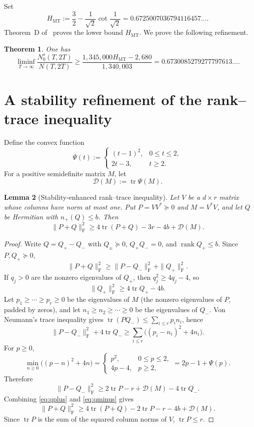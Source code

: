 \documentclass[11pt]{article}
\newtheorem{theorem}{Theorem}[section]
\newtheorem{lemma}[theorem]{Lemma}
\DeclareMathOperator{\tr}{tr}
\newcommand{\F}{\mathrm F}
\newcommand{\cD}{\mathcal D}
\begin{document}
Set
\[
 H_{\mathrm{MT}}
 :=\frac32-\frac1{\sqrt2}\cot\frac1{\sqrt2}
 =0.6725007036794116457\ldots .
\]
Theorem~D of~\cite{Claude26} proves the lower bound $H_{\mathrm{MT}}$.
We prove the following refinement.

\begin{theorem}\label{thm:main}
One has
\[
 \liminf_{T\to\infty}
 \frac{N_0^s(T,2T)}{N(T,2T)}
 \ge
 \frac{1{,}345{,}000H_{\mathrm{MT}}-2{,}680}{1{,}340{,}003}
 =0.6730085279277797613\ldots .
\]
\end{theorem}

\section{A stability refinement of the rank--trace inequality}

Define the convex function
\begin{equation}\label{eq:Psi}
 \Psi(t):=
 \begin{cases}
  (t-1)^2,&0\le t\le2,\\
  2t-3,&t\ge2.
 \end{cases}
\end{equation}
For a positive semidefinite matrix $M$, let
\[
 \cD(M):=\tr\Psi(M).
\]

\begin{lemma}[Stability-enhanced rank--trace inequality]\label{lem:stable-rank-trace}
Let $V$ be a $d\times r$ matrix whose columns have norm at most one.  Put
$P=VV^*\succeq0$ and $M=V^*V$, and let $Q$ be Hermitian with $n_+(Q)\le b$.
Then
\begin{equation}\label{eq:stable-rank-trace}
 \|P+Q\|_{\F}^2
 \ge 4\tr(P+Q)-3r-4b+\cD(M).
\end{equation}
\end{lemma}

\begin{proof}
Write $Q=Q_+-Q_-$ with $Q_\pm\succeq0$, $Q_+Q_-=0$, and
$\operatorname{rank}Q_+\le b$.  Since $P,Q_+\succeq0$,
\[
 \|P+Q\|_{\F}^2
 \ge \|P-Q_-\|_{\F}^2+\|Q_+\|_{\F}^2.
\]
If $q_j>0$ are the nonzero eigenvalues of $Q_+$, then
$q_j^2\ge4q_j-4$, so
\begin{equation}\label{eq:qplus}
 \|Q_+\|_{\F}^2\ge4\tr Q_+-4b.
\end{equation}
Let $p_1\ge\cdots\ge p_r\ge0$ be the eigenvalues of $M$ (the nonzero
eigenvalues of $P$, padded by zeros), and let $n_1\ge n_2\ge\cdots\ge0$
be the eigenvalues of $Q_-$.  Von Neumann's trace inequality gives
$\tr(PQ_-)\le\sum_{i\le r}p_in_i$, hence
\[
 \|P-Q_-\|_{\F}^2+4\tr Q_-
 \ge \sum_{i\le r}\bigl((p_i-n_i)^2+4n_i\bigr).
\]
For $p\ge0$,
\[
 \min_{n\ge0}\bigl((p-n)^2+4n\bigr)
 =\begin{cases}p^2,&0\le p\le2,\\4p-4,&p\ge2,\end{cases}
 =2p-1+\Psi(p).
\]
Therefore
\begin{equation}\label{eq:qminus}
 \|P-Q_-\|_{\F}^2
 \ge2\tr P-r+\cD(M)-4\tr Q_-.
\end{equation}
Combining \eqref{eq:qplus} and \eqref{eq:qminus} gives
\[
 \|P+Q\|_{\F}^2
 \ge4\tr(P+Q)-2\tr P-r-4b+\cD(M).
\]
Since $\tr P$ is the sum of the squared column norms of $V$, $\tr P\le r$.
\end{proof}
\end{document}
